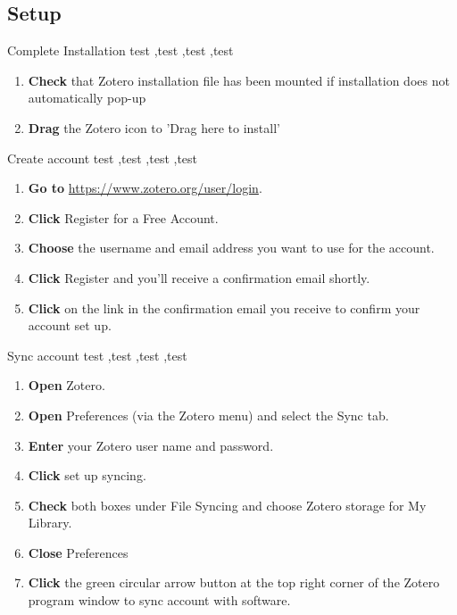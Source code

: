 \documentclass[10pt,a4paper]{article}
\begin{document}
\subsection{Setup}
\begin{textbox}{Complete Installation}
test  \sep test \sep test \sep test

\bigskip

\begin{enumerate}
\item \textbf{Check} that Zotero installation file has been mounted if installation does not automatically pop-up
\item \textbf{Drag} the Zotero icon to 'Drag here to install'
\end{enumerate}

\end{textbox}

\begin{textbox}{Create account}
test  \sep test \sep test \sep test

\bigskip

\begin{enumerate}
\item \textbf{Go to}  \href{https://www.zotero.org/user/login}{https://www.zotero.org/user/login}. 
\item \textbf{Click} Register for a Free Account.
\item \textbf{Choose} the username and email address you want to use for the account. 
\item \textbf{Click} Register and you’ll receive a confirmation email shortly. 
\item \textbf{Click} on the link in the confirmation email you receive to confirm your account set up.
\end{enumerate}

\end{textbox}


\begin{textbox}{Sync account}
test  \sep test \sep test \sep test

\bigskip

\begin{enumerate}
\item \textbf{Open} Zotero.
\item \textbf{Open} Preferences (via the Zotero menu) and select the Sync tab.
\item \textbf {Enter} your Zotero user name and password.
\item \textbf {Click} set up syncing.
\item \textbf {Check} both boxes under File Syncing and choose Zotero storage for My Library.
\item \textbf {Close} Preferences
\item \textbf {Click} the green circular arrow button at the top right corner of the Zotero program window to sync account with software.
\end{enumerate}

\end{textbox}
\end{document}
